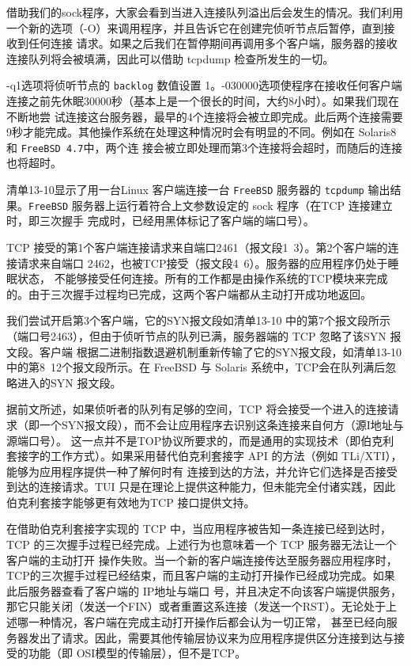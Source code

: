 借助我们的sock程序，大家会看到当进入连接队列溢出后会发生的情况。我们利用一个新的选项（-O）来调用程序，并且告诉它在创建完侦听节点后暂停，直到接收到任何连接
请求。如果之后我们在暂停期间再调用多个客户端，服务器的接收连接队列将会被填满，因此可以借助 tcpdump 检查所发生的一切。

-q1选项将侦听节点的 \verb|backlog| 数值设置
1。-030000选项使程序在接收任何客户端连接之前先休眠30000秒（基本上是一个很长的时间，大约8小时）。如果我们现在不断地尝
试连接这台服务器，最早的4个连接将会被立即完成。此后两个连接需要9秒才能完成。其他操作系统在处理这种情况时会有明显的不同。例如在
Solaris8和 \verb|FreeBSD 4.7|中，两个连
接会被立即处理而第3个连接将会超时，而随后的连接也将超时。

清单13-10显示了用一台Linux 客户端连接一台 \verb|FreeBSD| 服务器的 \verb|tcpdump|
输出结果。\verb|FreeBSD| 服务器上运行着符合上文参数设定的 sock 程序（在TCP 连接建立时，即三次握手
完成时，已经用黑体标记了客户端的端口号）。

TCP 接受的第1个客户端连接请求来自端口2461（报文段1~3）。第2个客户端的连接请求来自端口
2462，也被TCP接受（报文段4~6）。服务器的应用程序仍处于睡眠状态，
不能够接受任何连接。所有的工作都是由操作系统的TCP模块来完成的。由于三次握手过程均已完成，这两个客户端都从主动打开成功地返回。

我们尝试开启第3个客户端，它的SYN报文段如清单13-10 中的第7个报文段所示（端口号2463），但由于侦听节点的队列已满，服务器端的
TCP 忽略了该SYN 报文段。客户端
根据二进制指数退避机制重新传输了它的SYN报文段，如清单13-10中的第8~12个报文段所示。在 FreeBSD 与 Solaris
系统中，TCP会在队列满后忽略进入的SYN 报文段。

据前文所述，如果侦听者的队列有足够的空间，TCP
将会接受一个进入的连接请求（即一个SYN报文段），而不会让应用程序去识别这条连接来自何方（源I地址与源端口号）。
这一点并不是TOP协议所要求的，而是通用的实现技术（即伯克利套接字的工作方式）。如果采用替代伯克利套接字 API 的方法（例如
TLi/XTI），能够为应用程序提供一种了解何时有
连接到达的方法，并允许它们选择是否接受到达的连接请求。TUI 只是在理论上提供这种能力，但未能完全付诸实践，因此伯克利套接字能够更有效地为TCP 接口提供文持。

在借助伯克利套接字实现的 TCP 中，当应用程序被告知一条连接已经到达时，TCP 的三次握手过程已经完成。上述行为也意味着一个 TCP
服务器无法让一个客户端的主动打开
操作失败。当一个新的客户端连接传达至服务器应用程序时，TCP的三次握手过程已经结束，而且客户端的主动打开操作已经成功完成。如果此后服务器查看了客户端的
IP地址与端口
号，并且决定不向该客户端提供服务，那它只能关闭（发送一个FIN）或者重置这系连接（发送一个RST）。无论处于上述哪一种情况，客户端在完成主动打开操作后都会认为一切正常，
甚至已经向服务器发出了请求。因此，需要其他传输层协议来为应用程序提供区分连接到达与接受的功能（即 OSI模型的传输层），但不是TCP。
